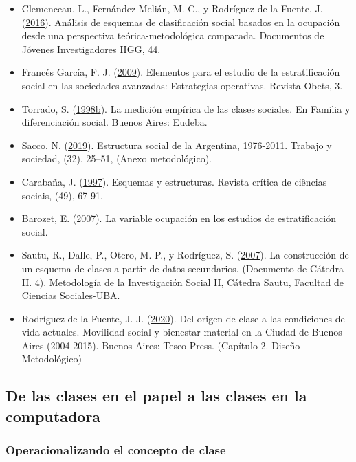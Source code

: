 \documentclass[
]{article}
\begin{document}
\begin{itemize}
\item
  Clemenceau, L., Fernández Melián, M. C., y Rodríguez de la Fuente, J. (\protect\hyperlink{ref-Clemenceau.etal2016}{2016}). Análisis de esquemas de clasificación social basados en la ocupación desde una perspectiva teórica-metodológica comparada. Documentos de Jóvenes Investigadores IIGG, 44.
\item
  Francés García, F. J. (\protect\hyperlink{ref-FrancesGarcia2009}{2009}). Elementos para el estudio de la estratificación social en las sociedades avanzadas: Estrategias operativas. Revista Obets, 3.
\item
  Torrado, S. (\protect\hyperlink{ref-Torrado1998d}{1998b}). La medición empírica de las clases sociales. En Familia y diferenciación social. Buenos Aires: Eudeba.
\item
  Sacco, N. (\protect\hyperlink{ref-Sacco2019}{2019}). Estructura social de la Argentina, 1976-2011. Trabajo y sociedad, (32), 25--51, (Anexo metodológico).
\item
  Carabaña, J. (\protect\hyperlink{ref-Carabana1997}{1997}). Esquemas y estructuras. Revista crítica de ciências sociais, (49), 67-91.
\item
  Barozet, E. (\protect\hyperlink{ref-Barozet2007}{2007}). La variable ocupación en los estudios de estratificación social.
\item
  Sautu, R., Dalle, P., Otero, M. P., y Rodríguez, S. (\protect\hyperlink{ref-Sautu.etal2007}{2007}). La construcción de un esquema de clases a partir de datos secundarios. (Documento de Cátedra II. 4). Metodología de la Investigación Social II, Cátedra Sautu, Facultad de Ciencias Sociales-UBA.
\item
  Rodríguez de la Fuente, J. J. (\protect\hyperlink{ref-RodriguezdelaFuente2020}{2020}). Del origen de clase a las condiciones de vida actuales. Movilidad social y bienestar material en la Ciudad de Buenos Aires (2004-2015). Buenos Aires: Teseo Press. (Capítulo 2. Diseño Metodológico)
\end{itemize}

\hypertarget{computadora}{%
\subsection{De las clases en el papel a las clases en la computadora}\label{computadora}}

\hypertarget{operacionalizando-el-concepto-de-clase}{%
\subsubsection{Operacionalizando el concepto de clase}\label{operacionalizando-el-concepto-de-clase}}
\end{document}
